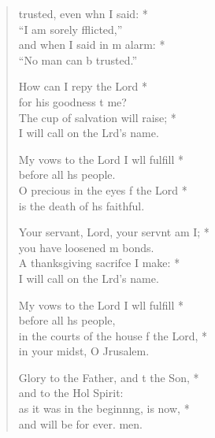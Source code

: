 \begin{verse}
  \begin{patverse}
     trusted, even whn I said: *\Med\\
    “I am sorely fflicted,”\\
    and when I said in m alarm: *\Med\\
    “No man can b trusted.”
    
    How can I repy the Lord *\Med\\
    for his goodness t me?\\
    The cup of salvation  will raise; *\Med\\
    I will call on the Lrd’s name.
    
    My vows to the Lord I w\pointup{\i}ll fulfill *\Med\\
    before all h\pointup{\i}s people.\\
    O precious in the eyes f the Lord *\Med\\
    is the death of h\pointup{\i}s faithful.

    Your servant, Lord, your servnt am I; *\Med\\
    you have loosened m bonds.\\
    A thanksgiving sacrif\pointup{\i}ce I make: *\Med\\
    I will call on the Lrd’s name.

    My vows to the Lord I w\pointup{\i}ll fulfill *\Med\\
    before all h\pointup{\i}s people,\\
    in the courts of the house f the Lord, *\Med\\
    in your midst, O Jrusalem.

    Glory to the Father, and t the Son, *\Med\\
    and to the Hol Spirit:\\
    as it was in the beginn\pointup{\i}ng, is now, *\Med\\
    and will be for ever. men.
  \end{patverse}
\end{verse}
